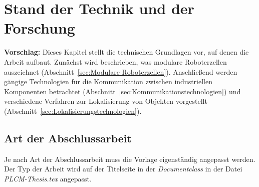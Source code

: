 \cleardoublepage
\chapter{Stand der Technik und der Forschung}
\label{ch:Stand_der_Technik}

\textbf{Vorschlag:} Dieses Kapitel stellt die technischen Grundlagen vor, auf denen die Arbeit aufbaut. Zunächst wird beschrieben, was modulare Roboterzellen auszeichnet (Abschnitt~\ref{sec:Modulare Roboterzellen}). Anschließend werden gängige Technologien für die Kommunikation zwischen industriellen Komponenten betrachtet (Abschnitt~\ref{sec:Kommunikationstechnologien}) und verschiedene Verfahren zur Lokalisierung von Objekten vorgestellt (Abschnitt~\ref{sec:Lokalisierungstechnologien}).

\section{Art der Abschlussarbeit}
Je nach Art der Abschlussarbeit muss die Vorlage eigenständig angepasst werden. 
Der Typ der Arbeit wird auf der Titelseite in der \textit{Documentclass} in der Datei \textit{PLCM-Thesis.tex} angepasst.  

